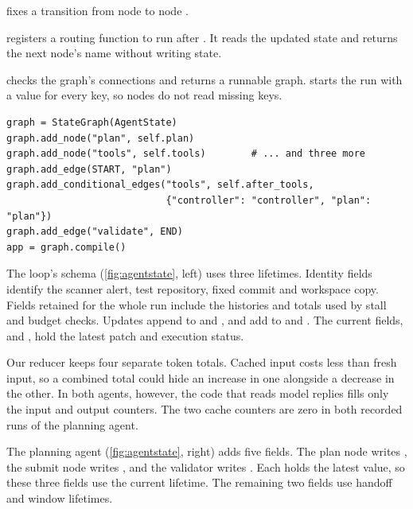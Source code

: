 \item {} fixes a transition from node  to node .

\item {} registers a routing function to run after
. It reads the updated state and returns the next node's name without writing state.

\item {} checks the graph's connections and returns a runnable graph.
 starts the run with a value for every key, so nodes do not
read missing keys.

\ei

\begin{lstlisting}[basicstyle=\ttfamily\scriptsize]
graph = StateGraph(AgentState)
graph.add_node("plan", self.plan)
graph.add_node("tools", self.tools)        # ... and three more
graph.add_edge(START, "plan")
graph.add_conditional_edges("tools", self.after_tools,
                            {"controller": "controller", "plan": "plan"})
graph.add_edge("validate", END)
app = graph.compile()
\end{lstlisting}

The loop's schema (\cref{fig:agentstate}, left) uses three lifetimes. Identity fields identify the
scanner alert, test repository, fixed commit and workspace copy. Fields retained for the whole
run include the histories and totals used by stall and budget checks. Updates append to
 and , and add to  and
. The current fields,  and , hold the
latest patch and execution status.

Our  reducer keeps four separate token totals. Cached input costs less than
fresh input, so a combined total could hide an increase in one alongside a decrease in the
other. In both agents, however, the code that reads model replies fills only the input and
output counters. The two cache counters are zero in both recorded runs of the planning agent.

The planning agent (\cref{fig:agentstate}, right) adds five fields. The plan node writes
, the submit node writes , and the validator writes
. Each holds the latest value, so these three fields use the current
lifetime. The remaining two fields use handoff and window lifetimes.

